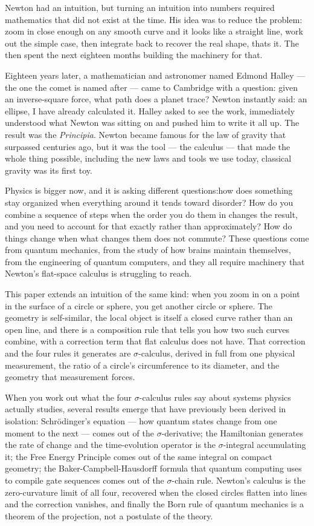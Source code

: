 \documentclass[12pt]{article}
\begin{document}
Newton had an intuition, but turning an intuition into numbers required mathematics that did not exist at the time. His idea was to reduce the problem: zoom in close enough on any smooth curve and it looks like a straight line, work out the simple case, then integrate back to recover the real shape, thats it. The then spent the next eighteen months building the machinery for that.

Eighteen years later, a mathematician and astronomer named Edmond Halley --- the one the comet is named after --- came to Cambridge with a question: given an inverse-square force, what path does a planet trace? Newton instantly said: an ellipse, I have already calculated it. Halley asked to see the work, immediately understood what Newton was sitting on and pushed him to write it all up. The result was the \emph{Principia}. Newton became famous for the law of gravity that surpassed centuries ago, but it was the tool --- the calculus --- that made the whole thing possible, including the new laws and tools we use today, classical gravity was its first toy.

Physics is bigger now, and it is asking different questions:how does something stay organized when everything around it tends toward disorder? How do you combine a sequence of steps when the order you do them in changes the result, and you need to account for that exactly rather than approximately? How do things change when what changes them does not commute? These questions come from quantum mechanics, from the study of how brains maintain themselves, from the engineering of quantum computers, and they all require machinery that Newton's flat-space calculus is struggling to reach.

This paper extends an intuition of the same kind: when you zoom in on a point in the surface of a circle or sphere, you get another circle or sphere. The geometry is self-similar, the local object is itself a closed curve rather than an open line, and there is a composition rule that tells you how two such curves combine, with a correction term that flat calculus does not have. That correction and the four rules it generates are $\sigma$-calculus, derived in full from one physical measurement, the ratio of a circle's circumference to its diameter, and the geometry that measurement forces.

When you work out what the four $\sigma$-calculus rules say about systems physics actually studies, several results emerge that have previously been derived in isolation: Schr\"odinger's equation --- how quantum states change from one moment to the next --- comes out of the $\sigma$-derivative; the Hamiltonian generates the rate of change and the time-evolution operator is the $\sigma$-integral accumulating it; the Free Energy Principle comes out of the same integral on compact geometry; the Baker-Campbell-Hausdorff formula that quantum computing uses to compile gate sequences comes out of the $\sigma$-chain rule. Newton's calculus is the zero-curvature limit of all four, recovered when the closed circles flatten into lines and the correction vanishes, and finally the Born rule of quantum mechanics is a theorem of the projection, not a postulate of the theory.
\end{document}
